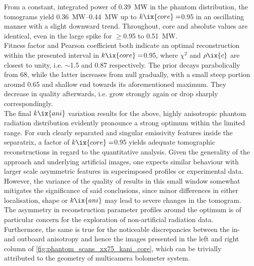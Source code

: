                 From a constant, integrated power of \SI{0.39}{\mega\watt} in the phantom distribution, the tomograms yield \SIrange{0.36}{0.44}{\mega\watt} up to $k\ix{core}=$\SI{0.95}{\arbitraryunit} in an oscillating manner with a slight downward trend. Throughout, core and absolute values are identical, even in the large spike for $\ge$\SI{0.95}{\arbitraryunit} to \SI{0.51}{\mega\watt}.\\%
                Fitness factor and Pearson coefficient both indicate an optimal reconstruction within the presented interval in $k\ix{core}=$\SI{0.95}{\arbitraryunit}, where $\chi^{2}$ and $\rho\ix{c}$ are closest to unity, i.e. $\sim$\SI{1.5}{\arbitraryunit} and \SI{0.87}{\arbitraryunit} respectively. The prior decays parabolically from \SI{68}{\arbitraryunit}, while the latter increases from null gradually, with a small steep portion around \SI{0.65}{\arbitraryunit} and shallow end towards its aforementioned maximum. They decrease in quality afterwards, i.e. grow strongly again or drop sharply correspondingly.\\%
                The final $k\ix{ani}$ variation results for the above, highly anisotropic phantom radiation distribution evidently pronounce a strong optimum within the limited range. For such clearly separated and singular emissivity features inside the separatrix, a factor of $k\ix{core}=$\SI{0.95}{\arbitraryunit} yields adequate tomographic reconstructions in regard to the quantitative analysis. Given the generality of the approach and underlying artificial images, one expects similar behaviour with larger scale asymmetric features in superimposed profiles or experimental data. However, the variance of the quality of results in this small window somewhat mitigates the significance of said conclusions, since minor differences in either localisation, shape or $k\ix{ani}$ may lead to severe changes in the tomogram. The asymmetry in reconstruction parameter profiles around the optimum is of particular concern for the exploration of non-artificial radiation data. Furthermore, the same is true for the noticeable discrepancies between the in- and outboard anisotropy and hence the images presented in the left and right column of \cref{fig:phantom_scans_xx75_kani_core}, which can be trivially attributed to the geometry of multicamera bolometer system.\\%
%
                \newline%
